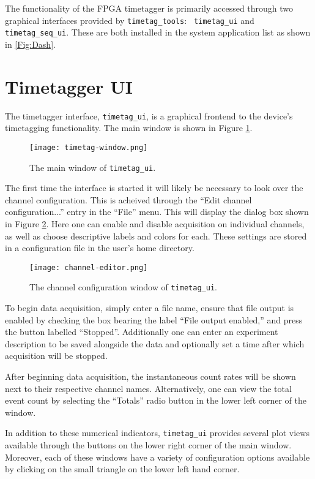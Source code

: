 The functionality of the FPGA timetagger is primarily accessed through
two graphical interfaces provided by {\tt timetag\_tools}: {\tt
 timetag\_ui} and {\tt timetag\_seq\_ui}. These are both installed in
the system application list as shown in \ref{Fig:Dash}.

\section{Timetagger UI}

The timetagger interface, {\tt timetag\_ui}, is a graphical frontend to
the device's timetagging functionality. The main window is shown in Figure 
\ref{Fig:MainWindow}.

\begin{figure}
  \center
  \texttt{[image: timetag-window.png]}
  \caption{The main window of {\tt timetag\_ui}.}
  \label{Fig:MainWindow}
\end{figure}

The first time the interface is started it will likely be necessary to
look over the channel configuration. This is acheived through the
``Edit channel configuration...'' entry in the ``File'' menu. This
will display the dialog box shown in Figure
\ref{Fig:ChannelConfig}. Here one can enable and disable acquisition
on individual channels, as well as choose descriptive labels and colors
for each. These settings are stored in a configuration file in the
user's home directory.

\begin{figure}
  \center
  \texttt{[image: channel-editor.png]}
  \caption{The channel configuration window of {\tt timetag\_ui}.}
  \label{Fig:ChannelConfig}
\end{figure}

To begin data acquisition, simply enter a file name, ensure that file
output is enabled by checking the box bearing the label ``File output
enabled,'' and press the button labelled ``Stopped''. Additionally one
can enter an experiment description to be saved alongside the data and
optionally set a time after which acquisition will be stopped.

After beginning data acquisition, the instantaneous count rates will
be shown next to their respective channel names. Alternatively, one
can view the total event count by selecting the ``Totals'' radio
button in the lower left corner of the window.

In addition to these numerical indicators, {\tt timetag\_ui} provides
several plot views available through the buttons on the lower right
corner of the main window. Moreover, each of these windows have a
variety of configuration options available by clicking on the small
triangle on the lower left hand corner.

